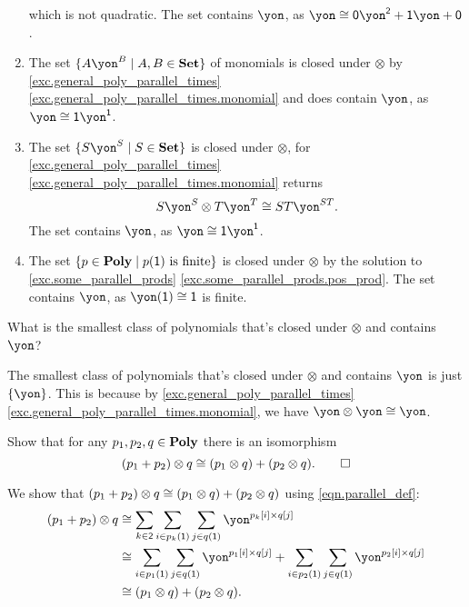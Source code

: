 \documentclass[Book-Poly]{subfiles}
\begin{document}
\begin{exercise}
\begin{solution}
\begin{enumerate}
\[	\]
	which is not quadratic.
	The set contains $\yon$, as $\yon \iso \0\yon^\2 + \1\yon + \0$.
	\item The set $\{A\yon^B\mid A,B\in\smset\}$ of monomials is closed under $\otimes$ by \cref{exc.general_poly_parallel_times} \cref{exc.general_poly_parallel_times.monomial} and does contain $\yon$, as $\yon \iso \1\yon^\1$.
	\item The set $\{S\yon^S\mid S\in\smset\}$ is closed under $\otimes$, for \cref{exc.general_poly_parallel_times} \cref{exc.general_poly_parallel_times.monomial} returns
	\[
	    S\yon^S \otimes T\yon^T \iso ST\yon^{ST}.
	\]
	The set contains $\yon$, as $\yon \iso \1\yon^\1$.
	\item The set $\{p\in\mathbf{Poly}\mid p(\textsf{1})\text{ is finite}\}$ is closed under $\otimes$ by the solution to \cref{exc.some_parallel_prods} \cref{exc.some_parallel_prods.pos_prod}.
	The set contains $\yon$, as $\yon(\1) \iso \1$ is finite.
\end{enumerate}
\end{solution}
\end{exercise}

\begin{exercise}
What is the smallest class of polynomials that's closed under $\otimes$ and contains $\yon$?
\begin{solution}
The smallest class of polynomials that's closed under $\otimes$ and contains $\yon$ is just $\{\yon\}$.
This is because by \cref{exc.general_poly_parallel_times} \cref{exc.general_poly_parallel_times.monomial}, we have $\yon \otimes \yon \iso \yon$.
\end{solution}
\end{exercise}

\begin{exercise}
Show that for any $p_1,p_2,q\in\mathbf{Poly}$ there is an isomorphism
\[
(p_1+p_2)\otimes q\cong (p_1\otimes q)+(p_2\otimes q).
\qedhere
\]
\begin{solution}
We show that $(p_1 + p_2) \otimes q \cong (p_1 \otimes q) + (p_2 \otimes q)$ using \eqref{eqn.parallel_def}:
\begin{align*}
    (p_1 + p_2) \otimes q &\iso \sum_{k \in \2} \sum_{i \in p_k(\1)} \sum_{j \in q(\1)} \yon^{p_k[i] \times q[j]} \\
    &\iso \sum_{i \in p_1(\1)} \sum_{j \in q(\1)} \yon^{p_1[i] \times q[j]} + \sum_{i \in p_2(\1)} \sum_{j \in q(\1)} \yon^{p_2[i] \times q[j]} \\
    &\iso (p_1 \otimes q) + (p_2 \otimes q).
\end{align*}
\end{solution}
\end{exercise}
\end{document}
